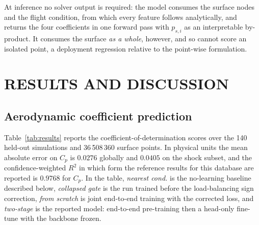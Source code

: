 \documentclass{WCCM-ECCOMAS_2026_Full_Paper}
\begin{document}
At inference no solver output is required: the model consumes the
surface nodes and the flight condition, from which every feature
follows analytically, and returns the four coefficients in one forward
pass with $p_{s,i}$ as an interpretable by-product.  It consumes the
surface \emph{as a whole}, however, and so cannot score an isolated
point, a deployment regression relative to the point-wise
formulation.

\section{RESULTS AND DISCUSSION}
\label{sec:results}

\subsection{Aerodynamic coefficient prediction}

Table~\ref{tab:results} reports the coefficient-of-determination
scores over the 140 held-out simulations and 36\,508\,360 surface
points.  In physical units the mean absolute error on $C_p$ is
$0.0276$ globally and $0.0405$ on the shock subset, and the
confidence-weighted $R^{2}$ in which form the reference results for
this database are reported is $0.9768$ for $C_p$.  In the table,
\emph{nearest cond.} is the no-learning baseline described below,
\emph{collapsed gate} is the run trained before the load-balancing
sign correction, \emph{from scratch} is joint end-to-end training with
the corrected loss, and \emph{two-stage} is the reported model:
end-to-end pre-training then a head-only fine-tune with the backbone
frozen.
\end{document}
